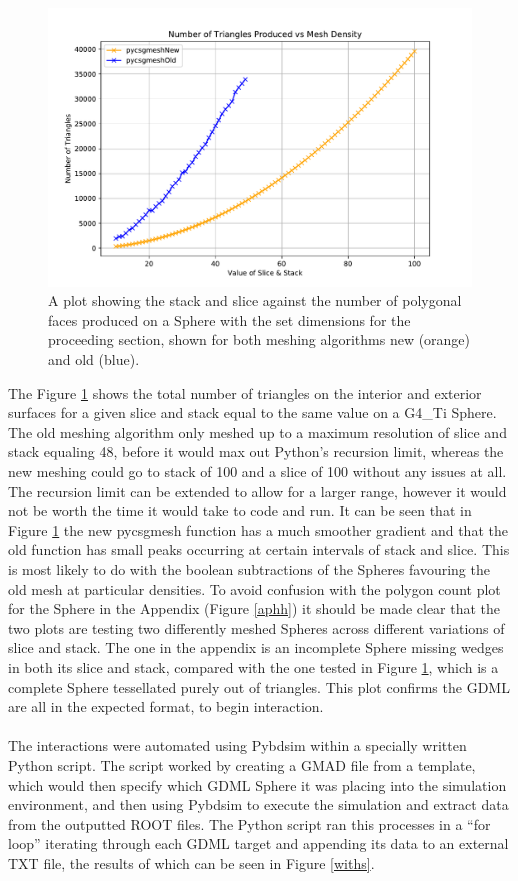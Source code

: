 \documentclass[12pt,a4paper]{article}
\begin{document}
\begin{figure}[h!]
\centering
\includegraphics[height=.4\linewidth]{Images//Triangles//MeshvTRi1.pdf}
\caption[width=\columnwidth]{A plot showing the stack and slice against the number of polygonal faces produced on a Sphere with the set dimensions for the proceeding section, shown for both meshing algorithms new (orange) and old (blue).}
\label{tritri}
\end{figure}
\noindent The Figure \ref{tritri} shows the total number of triangles on the interior and exterior surfaces for a given slice and stack equal to the same value on a G4\_Ti Sphere. The old meshing algorithm only meshed up to a maximum resolution of slice and stack equaling 48, before it would max out Python's recursion limit, whereas the new meshing could go to stack of 100 and a slice of 100 without any issues at all. The recursion limit can be extended to allow for a larger range, however it would not be worth the time it would take to code and run. 
It can be seen that in Figure \ref{tritri} the new pycsgmesh function has a much smoother gradient and that the old function has small peaks occurring at certain intervals of stack and slice. This is most likely to do with the boolean subtractions of the Spheres favouring the old mesh at particular densities. To avoid confusion with the polygon count plot for the Sphere in the Appendix (Figure \ref{aphh}) it should be made clear that the two plots are testing two differently meshed Spheres across different variations of slice and stack. The one in the appendix is an incomplete Sphere missing wedges in both its slice and stack, compared with the one tested in Figure \ref{tritri}, which is a complete Sphere tessellated purely out of triangles.  This plot confirms the GDML are all in the expected format, to begin interaction.
 \\\\
\noindent The interactions were automated using Pybdsim within a specially written Python script. The script worked by creating a GMAD file from a template, which would then specify which GDML Sphere it was placing into the simulation environment, and then using Pybdsim to execute the simulation and extract data from the outputted ROOT files. The Python script ran this processes in a ``for loop'' iterating through each GDML target and appending its data to an external TXT file, the results of which can be seen in Figure \ref{withs}.
\end{document}
